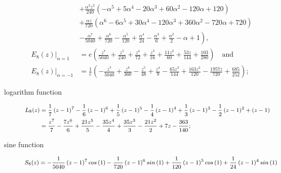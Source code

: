 \begin{description}
\begin{equation}
\begin{split}
                                &+ \frac{\alpha^{2} z^{2}}{240} \left(- \alpha^{5} + 5 \alpha^{4} - 20 \alpha^{3} + 60 \alpha^{2} - 120 \alpha + 120\right) \\
                                &+ \frac{\alpha z}{720} \left(\alpha^{6} - 6 \alpha^{5} + 30 \alpha^{4} - 120 \alpha^{3} + 360 \alpha^{2} - 720 \alpha + 720\right) \\
                                &- \left.\frac{\alpha^{7}}{5040} + \frac{\alpha^{6}}{720} - \frac{\alpha^{5}}{120} + \frac{\alpha^{4}}{24} - \frac{\alpha^{3}}{6} + \frac{\alpha^{2}}{2} -\alpha + 1\right), \\
        \left.E_{8}{\left (z \right )}\right|_{\alpha=1} &= e \left(\frac{z^{7}}{5040} + \frac{z^{5}}{240} + \frac{z^{4}}{72} + \frac{z^{3}}{16} + \frac{11 z^{2}}{60} + \frac{53 z}{144} + \frac{103}{280}\right)\quad\text{and}\\
        \left.E_{8}{\left (z \right )}\right|_{\alpha=-1} &=\frac{1}{e} \left( - \frac{z^{7}}{5040} + \frac{z^{6}}{360} - \frac{z^{5}}{48} + \frac{z^{4}}{9}\right. - \left.\frac{65 z^{3}}{144} + \frac{163 z^{2}}{120} - \frac{1957 z}{720} + \frac{685}{252}\right);
    \end{split}
    \label{eq:exp:interpolating:polynomial}
\end{equation}
\item[logarithm function]
\begin{displaymath}
\footnotesize
    \begin{split}
        L_{8}{\left (z \right )}    &= \frac{1}{7} \left(z - 1\right)^{7} - \frac{1}{6} \left(z - 1\right)^{6} + \frac{1}{5} \left(z - 1\right)^{5} - \frac{1}{4} \left(z - 1\right)^{4} + \frac{1}{3} \left(z - 1\right)^{3} - \frac{1}{2} \left(z - 1\right)^{2} + (z - 1)\\
                                &= \frac{z^{7}}{7} - \frac{7 z^{6}}{6} + \frac{21 z^{5}}{5} - \frac{35 z^{4}}{4} + \frac{35 z^{3}}{3} - \frac{21 z^{2}}{2} + 7 z - \frac{363}{140};
    \end{split}
\end{displaymath}
\item[sine function]
\begin{displaymath}
    \footnotesize
    \begin{split}
        S_{8}{\left (z \right )} &= - \frac{1}{5040} \left(z - 1\right)^{7} cos\,{\left (1 \right )} - \frac{1}{720} \left(z - 1\right)^{6} sin\,{\left (1 \right )} + \frac{1}{120} \left(z - 1\right)^{5} cos\,{\left (1 \right )} + \frac{1}{24} \left(z - 1\right)^{4} sin\,{\left (1 \right )} \\

\end{split}
\end{displaymath}
\end{description}
